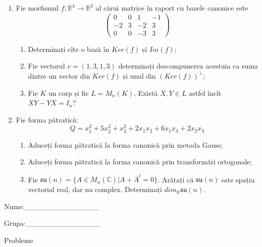 \documentclass{article}
\begin{document}
\begin{enumerate}
 \item Fie morfismul $f:\mathbb{R}^4 \to \mathbb{R}^3$ al cărui matrice în raport cu bazele canonice este
$$\begin{pmatrix}
0&0&1&-1\\
-2&3&-2&3\\
0&0&-3&3
\end{pmatrix}$$

\begin{enumerate}
\item Determinați cîte o bază în $Ker(f)$ și $Im(f)$;
\item Fie vectorul $v=(1,3,1,3)$ determinați descompunerea acestuia ca suma dintre un vector din $Ker(f)$ și unul din $(Ker(f))^\perp$;
\item Fie $K$ un corp și fie $L=M_n(K)$. Există $X,Y \in L$ astfel încît $XY-YX=I_n$?  
\end{enumerate}
\item Fie forma pătratică:
$$Q= x_1^2+5x_2^2+x_3^2+2x_1x_2+6x_1x_3+2x_2x_3$$

\begin{enumerate}
\item Aduceți forma pătratică la forma canonică prin metoda Gauss;
\item Aduceți forma pătratică la forma canonică prin transformări ortogonale;
\item Fie $\mathfrak{su}(n)=\{ A \in M_n(\mathbb{C}) | A+\bar{A}^t=0\}$. Arătați că $\mathfrak{su}(n)$ este spațiu vectorial real, dar nu complex.
Determinați $dim_{\mathbb{R}}\mathfrak{su}(n)$.
\end{enumerate}
\end{enumerate}
\newpage
\begin{flushright}
Nume:\_\_\_\_\_\_\_\_\_\_\_\_\_\_
 
 
Grupa:\_\_\_\_\_\_\_\_\_\_\_\_\_\_
\end{flushright}
\begin{center}
\vspace{2cm}
{\Large Probleme}
\vspace{2cm}
\end{center}
\end{document}
